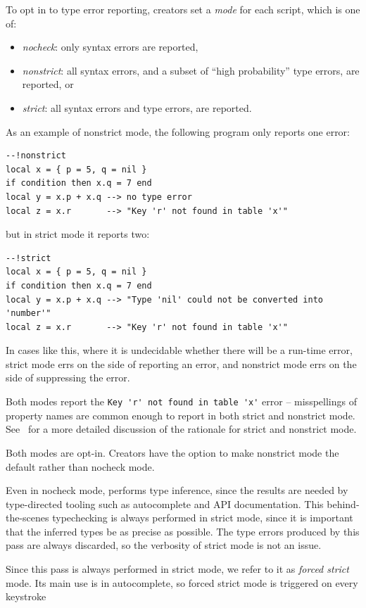 \documentclass[
  acmsmall,
  review,
]{acmart}
\begin{document}
To opt in to type error reporting, creators set a \emph{mode}
for each script, which is one of:
\begin{itemize}
\item \emph{nocheck}: only syntax errors are reported,
\item \emph{nonstrict}: all syntax errors, and a subset of ``high probability'' type errors, are reported, or
\item \emph{strict}: all syntax errors and type errors, are reported.
\end{itemize}
As an example of nonstrict mode, the following program only reports one error:
\begin{verbatim}
--!nonstrict
local x = { p = 5, q = nil }
if condition then x.q = 7 end
local y = x.p + x.q --> no type error
local z = x.r       --> "Key 'r' not found in table 'x'"
\end{verbatim}
but in strict mode it reports two:
\begin{verbatim}
--!strict
local x = { p = 5, q = nil }
if condition then x.q = 7 end
local y = x.p + x.q --> "Type 'nil' could not be converted into 'number'"
local z = x.r       --> "Key 'r' not found in table 'x'"
\end{verbatim}
In cases like this, where it is undecidable whether there will be a run-time error,
strict mode errs on the side of reporting an error, and nonstrict mode errs on
the side of suppressing the error.

Both modes report the \verb|Key 'r' not found in table 'x'| error --
misspellings of property names are common enough to report in both
strict and nonstrict mode. See~
for a more detailed discussion of the rationale for strict and nonstrict mode.

Both modes are opt-in. Creators have the option to make nonstrict mode
the default rather than nocheck mode.

Even in nocheck mode,  performs type inference, since
the results are needed by type-directed tooling such as autocomplete and
API documentation. This behind-the-scenes typechecking is always performed
in strict mode, since it is important that the inferred types be as precise
as possible. The type errors produced by this pass are always discarded,
so the verbosity of strict mode is not an issue.

Since this pass is always performed in strict mode, we refer to it as
\emph{forced strict} mode. Its main use is in autocomplete, so forced
strict mode is triggered on every keystroke
\end{document}
